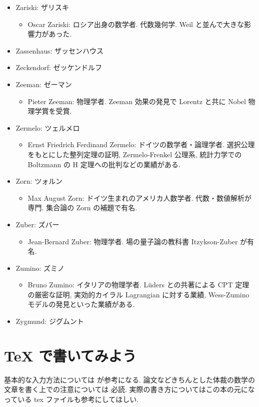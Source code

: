 \documentclass[openany, a4paper, oneside]{jsbook}
\begin{document}
\begin{itemize}
\item Zariski: ザリスキ
\begin{itemize}
\item Oscar Zariski: ロシア出身の数学者. 代数幾何学. Weil と並んで大きな影響力があった.
\end{itemize}
\item Zassenhaus: ザッセンハウス
\item Zeckendorf: ゼッケンドルフ
\item Zeeman: ゼーマン
\begin{itemize}
\item Pieter Zeeman: 物理学者. Zeeman 効果の発見で Lorentz と共に Nobel 物理学賞を受賞.
\end{itemize}
\item Zermelo: ツェルメロ
\begin{itemize}
\item Ernst Friedrich Ferdinand Zermelo: ドイツの数学者・論理学者. 選択公理をもとにした整列定理の証明, Zermelo-Frenkel 公理系, 統計力学での Boltzmann の H 定理への批判などの業績がある.
\end{itemize}
\item Zorn: ツォルン
\begin{itemize}
\item Max August Zorn: ドイツ生まれのアメリカ人数学者. 代数・数値解析が専門. 集合論の Zorn の補題で有名.
\end{itemize}
\item Zuber: ズバー
\begin{itemize}
\item Jean-Bernard Zuber: 物理学者. 場の量子論の教科書 Itzykson-Zuber が有名.
\end{itemize}
\item Zumino: ズミノ
\begin{itemize}
\item Bruno Zumino: イタリアの物理学者. L\"uders との共著による CPT 定理の厳密な証明, 実効的カイラル Lagrangian に対する業績, Wess-Zumino モデルの発見といった業績がある.
\end{itemize}
\item Zygmund: ジグムント
\end{itemize}
\chapter{\TeX{} で書いてみよう}

基本的な入力方法については \cite{TakashiSakai1} が参考になる.
論文などきちんとした体裁の数学の文章を書く上での注意については \cite{TadaoOda1} 必読.
実際の書き方についてはこの本の元になっている tex ファイルも参考にしてほしい.
\end{document}

